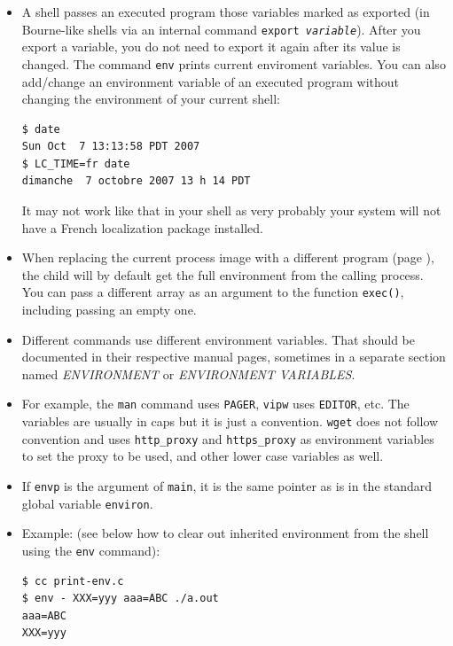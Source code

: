 \begin{itemize}
\item A shell passes an executed program those variables marked as exported
(in Bourne-like shells via an internal command \texttt{export \emph{variable}}).
After you export a variable, you do not need to export it again after its value
is changed.  The command \texttt{env} prints current enviroment variables.
You can also add/change an environment variable of an executed program without
changing the environment of your current shell:

\begin{verbatim}
$ date
Sun Oct  7 13:13:58 PDT 2007
$ LC_TIME=fr date
dimanche  7 octobre 2007 13 h 14 PDT
\end{verbatim}

It may not work like that in your shell as very probably your system will not
have a French localization package installed.
\item When replacing the current process image with a different program (page
\pageref{EXEC}), the child will by default get the full environment from the
calling process.  You can pass a different array as an argument to the function
\texttt{exec()}, including passing an empty one.
\item Different commands use different environment variables.  That should be
documented in their respective manual pages, sometimes in a separate section
named \emph{ENVIRONMENT} or \emph{ENVIRONMENT VARIABLES}.
\item For example, the \texttt{man} command uses \texttt{PAGER}, \texttt{vipw}
uses \texttt{EDITOR}, etc.  The variables are usually in caps but it is just a
convention.  \texttt{wget} does not follow convention and uses
\texttt{http\_proxy} and \texttt{https\_proxy} as environment variables to set
the proxy to be used, and other lower case variables as well.
\item If \texttt{envp} is the  argument of \texttt{main}, it is the same
pointer as is in the standard global variable \texttt{environ}.
\item Example:  (see below how to clear out inherited
environment from the shell using the \texttt{env} command):

\begin{verbatim}
$ cc print-env.c
$ env - XXX=yyy aaa=ABC ./a.out
aaa=ABC
XXX=yyy
\end{verbatim}
\end{itemize}


